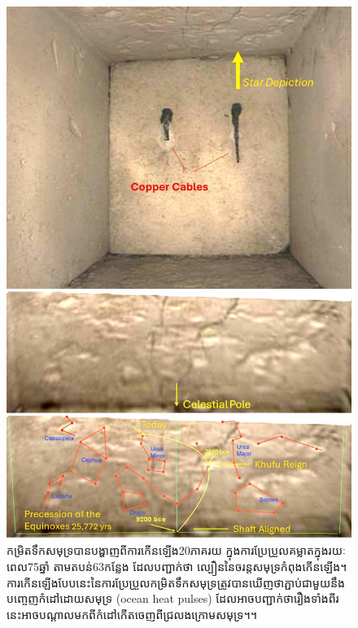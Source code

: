 \documentclass[10pt,twocolumn,letterpaper]{article}
\begin{document}
\begin{figure}[H]
\begin{center}
   \includegraphics[width=1\linewidth]{star-stone.jpg}
\end{center}
   \caption{កម្រិតទឹកសមុទ្របានបង្ហាញពីការកើនឡើង20ភាគរយ ក្នុងការប្រែប្រួលគម្លាតក្នុងរយៈពេល75ឆ្នាំ តាមតបន់63កន្លែង ដែលបញ្ជាក់ថា ល្បឿននៃចរន្តសមុទ្រកំពុងកើនឡើង។ការកើនឡើងបែបនេះនៃការប្រែប្រួលកម្រិតទឹកសមុទ្រត្រូវបានឃើញថាភ្ជាប់ជាមួយនឹង បញ្ចេញកំដៅដោយសមុទ្រ (ocean heat pulses) ដែលអាចបញ្ជាក់ថារឿងទាំងពីរនេះអាចបណ្តាលមកពីកំដៅកើតចេញពីជ្រលងក្រោមសមុទ្រ។\cite{28}។}
\label{fig:20}
\label{fig:onecol}
\end{figure}
\end{document}
